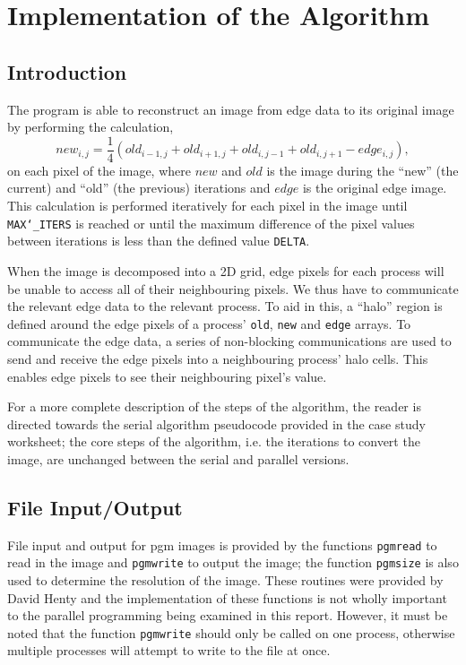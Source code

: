 \documentclass[11pt, a4paper]{article}
\begin{document}
	\section{Implementation of the Algorithm}
		\subsection{Introduction}
			The program is able to reconstruct an image from edge data to its original image by performing the calculation, $$ new_{i, j} = \frac{1}{4}(old_{i-1, j} + old_{i+1, j} + old_{i, j-1} + old_{i, j+1} - edge_{i, j}),$$ on each pixel of the image, where $new$ and $old$ is the image during the ``new'' (the current) and ``old'' (the previous) iterations and $edge$ is the original edge image. This calculation is performed iteratively for each pixel in the image until \texttt{MAX\char`_ITERS} is reached or until the maximum difference of the pixel values between iterations is less than the defined value \texttt{DELTA}.
			
			When the image is decomposed into a 2D grid, edge pixels for each process will be unable to access all of their neighbouring pixels. We thus have to communicate the relevant edge data to the relevant process. To aid in this, a ``halo'' region is defined around the edge pixels of a process' \texttt{old}, \texttt{new} and \texttt{edge} arrays. To communicate the edge data, a series of non-blocking communications are used to send and receive the edge pixels into a neighbouring process' halo cells. This enables edge pixels to see their neighbouring pixel's value.
			
			For a more complete description of the steps of the algorithm, the reader is directed towards the serial algorithm pseudocode provided in the case study worksheet; the core steps of the algorithm, i.e. the iterations to convert the image, are unchanged between the serial and parallel versions.
		
		\subsection{File Input/Output}
			File input and output for pgm images is provided by the functions \texttt{pgmread} to read in the image and \texttt{pgmwrite} to output the image; the  function \texttt{pgmsize} is also used to determine the resolution of the image. These routines were provided by David Henty and the implementation of these functions is not wholly important to the parallel programming being examined in this report. However, it must be noted that the function \texttt{pgmwrite} should only be called on one process, otherwise multiple processes will attempt to write to the file at once.
			
\end{document}
